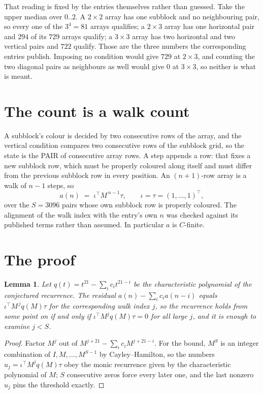 \documentclass[11pt,a4paper]{article}
\theoremstyle{plain}
\newtheorem{lemma}[theorem]{Lemma}
\theoremstyle{definition}
\begin{document}
That reading is fixed by the entries themselves rather than guessed. Take the upper median
over $0..2$. A $2\times2$ array has one subblock and no neighbouring pair, so every one of the
$3^4=81$ arrays qualifies; a $2\times3$ array has one horizontal pair and $294$ of its $729$
arrays qualify; a $3\times3$ array has two horizontal and two vertical pairs and $722$
qualify. Those are the three numbers the corresponding entries publish. Imposing no condition
would give $729$ at $2\times3$, and counting the two diagonal pairs as neighbours as well
would give $0$ at $3\times3$, so neither is what is meant.

\section{The count is a walk count}

A subblock's colour is decided by two consecutive rows of the array, and
the vertical condition compares two consecutive rows of the subblock grid, so the state is the
PAIR of consecutive array rows. A step appends a row: that fixes a new subblock row, which
must be properly coloured along itself and must differ from the previous subblock row in every
position. An $(n+1)$-row array is a walk of $n-1$ steps, so
\[
a(n)\;=\;\iota^{\!\top}M^{\,n-1}\tau,\qquad\iota=\tau=(1,\dots,1)^{\!\top},
\]
over the $S=3096$ pairs whose own subblock row is properly coloured.
The alignment of the walk index with the entry's own $n$ was checked against its published
terms rather than assumed. In particular $a$ is $C$-finite.

\section{The proof}

\begin{lemma}\label{lem:crit}
Let $q(t)=t^{21}-\sum_i c_it^{21-i}$ be the characteristic polynomial of the
conjectured recurrence. The residual $a(n)-\sum_ic_ia(n-i)$ equals
$\iota^{\!\top}M^{\,j}q(M)\tau$ for the corresponding walk index $j$, so the recurrence
holds from some point on if and only if $\iota^{\!\top}M^{j}q(M)\tau=0$ for all large $j$,
and it is enough to examine $j<S$.
\end{lemma}

\begin{proof}
Factor $M^{j}$ out of $M^{j+21}-\sum_ic_iM^{j+21-i}$. For the bound, $M^{S}$
is an integer combination of $I,M,\dots,M^{S-1}$ by Cayley--Hamilton, so the numbers
$u_j=\iota^{\!\top}M^{j}q(M)\tau$ obey the monic recurrence given by the characteristic
polynomial of $M$; $S$ consecutive zeros force every later one, and the last nonzero $u_j$
pins the threshold exactly.
\end{proof}
\end{document}
